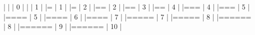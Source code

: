 \documentclass[10pt]{article}
\newenvironment{CodeChunk}{}{}
\begin{document}
\begin{CodeChunk}
\begin{CodeChunk}
\begin{CodeOutput}
  |                                                                       
  |                                                                 |   0%
  |                                                                       
  |                                                                 |   1%
  |                                                                       
  |=                                                                |   1%
  |                                                                       
  |=                                                                |   2%
  |                                                                       
  |==                                                               |   2%
  |                                                                       
  |==                                                               |   3%
  |                                                                       
  |==                                                               |   4%
  |                                                                       
  |===                                                              |   4%
  |                                                                       
  |===                                                              |   5%
  |                                                                       
  |====                                                             |   5%
  |                                                                       
  |====                                                             |   6%
  |                                                                       
  |====                                                             |   7%
  |                                                                       
  |=====                                                            |   7%
  |                                                                       
  |=====                                                            |   8%
  |                                                                       
  |======                                                           |   8%
  |                                                                       
  |======                                                           |   9%
  |                                                                       
  |======                                                           |  10%
  |                                                                       

\end{CodeOutput}
\end{CodeChunk}
\end{CodeChunk}
\end{document}
